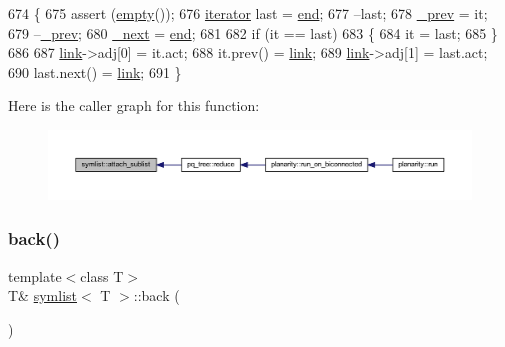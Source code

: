 \begin{DoxyCode}
674 \{ 
675     assert (\mbox{\hyperlink{classsymlist_aca11cd6c621376bc52a18828ef92e753}{empty}}());
676     \mbox{\hyperlink{classsymlist_a66045fbe3d98975e5537092ede8b50df}{iterator}} last = \mbox{\hyperlink{classsymlist_a7283589fa01f79d722f8256d7a6a7883}{end}};
677     --last;
678     \mbox{\hyperlink{classsymlist_ac5e2276db5018abebf297079a324ed9e}{\_prev}} = it;
679     --\mbox{\hyperlink{classsymlist_ac5e2276db5018abebf297079a324ed9e}{\_prev}};
680     \mbox{\hyperlink{classsymlist_a376c701eae20490b74a6866124bcb24c}{\_next}} = \mbox{\hyperlink{classsymlist_a7283589fa01f79d722f8256d7a6a7883}{end}};
681 
682     \textcolor{keywordflow}{if} (it == last)
683     \{
684     it = last;
685     \}
686 
687     \mbox{\hyperlink{classsymlist_a8fa81a7f6d0bb986bb593776db582c90}{link}}->adj[0] = it.act;
688     it.prev() = \mbox{\hyperlink{classsymlist_a8fa81a7f6d0bb986bb593776db582c90}{link}};
689     \mbox{\hyperlink{classsymlist_a8fa81a7f6d0bb986bb593776db582c90}{link}}->adj[1] = last.act;
690     last.next() = \mbox{\hyperlink{classsymlist_a8fa81a7f6d0bb986bb593776db582c90}{link}};
691 \}   
\end{DoxyCode}
Here is the caller graph for this function\+:\nopagebreak
\begin{figure}[H]
\begin{center}
\leavevmode
\includegraphics[width=350pt]{classsymlist_a526206a1d6fd2f2cef9f73ec499b6315_icgraph}
\end{center}
\end{figure}
\mbox{\label{classsymlist_abc0570ff78ded9210ac26865519d36e3}} 
\subsubsection{\texorpdfstring{back()}{back()}}
{\footnotesize\ttfamily template$<$class T$>$ \\
T\& \mbox{\hyperlink{classsymlist}{symlist}}$<$ T $>$\+::back (\begin{DoxyParamCaption}{ }\end{DoxyParamCaption})\hspace{0.3cm}{\ttfamily [inline]}}



